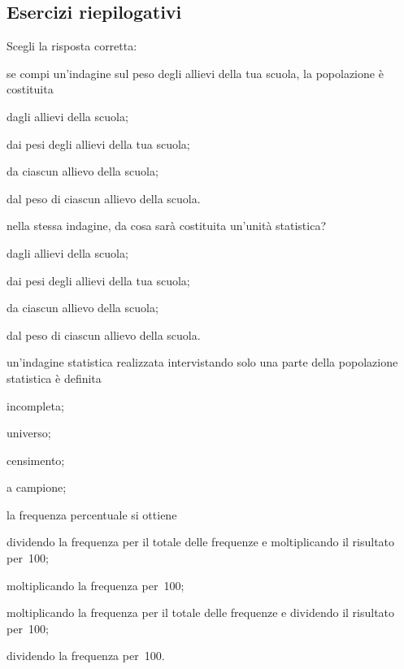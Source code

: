 \subsection{Esercizi riepilogativi}
\begin{esercizio}
\label{ese:A.39}
Scegli la risposta corretta:
\begin{enumerate*}
 \item se compi un'indagine sul peso degli allievi della tua scuola, la popolazione è costituita
 \begin{enumeratea}
 \item dagli allievi della scuola;
\item dai pesi degli allievi della tua scuola;
\item da ciascun allievo della scuola;
\item dal peso di ciascun allievo della scuola.
 \end{enumeratea}
 \item nella stessa indagine, da cosa sarà costituita un'unità statistica?
 \begin{enumeratea}
 \item dagli allievi della scuola;
\item dai pesi degli allievi della tua scuola;
\item da ciascun allievo della scuola;
\item dal peso di ciascun allievo della scuola.
 \end{enumeratea}
\item un'indagine statistica realizzata intervistando solo una parte della popolazione statistica è definita
 \begin{enumeratea}
 \item incompleta;
\item universo;
\item censimento;
\item a campione;
 \end{enumeratea}
\item la frequenza percentuale si ottiene
 \begin{enumeratea}
\item dividendo la frequenza per il totale delle frequenze e moltiplicando il risultato per~100;
\item moltiplicando la frequenza per~100;
\item moltiplicando la frequenza per il totale delle frequenze e dividendo il risultato per~100;
\item dividendo la frequenza per~100.
 \end{enumeratea}

\end{enumerate*}
\end{esercizio}
